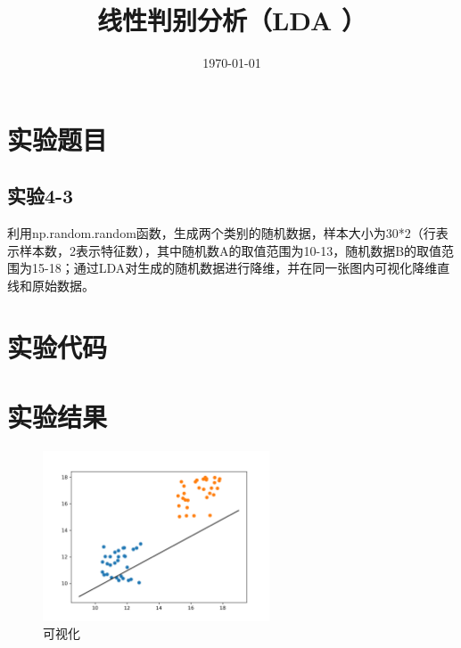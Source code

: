 \documentclass{../source/Experiment}
\title{线性判别分析（LDA
）}
\date{\today}
\begin{document}
    \makecover
    \section{实验题目}
        \subsection{实验4-3}
        利用np.random.random函数，生成两个类别的随机数据，样本大小为30*2（行表示样本数，2表示特征数），其中随机数A的取值范围为10-13，随机数据B的取值范围为15-18；通过LDA对生成的随机数据进行降维，并在同一张图内可视化降维直线和原始数据。


    \section{实验代码}
    
    
   
    \section{实验结果}
       
            \begin{figure}[H]
                \centering
                \includegraphics[width = 0.6\textwidth]{Part4/4-3.png}
                \caption{可视化}
            \end{figure}
    
\end{document}
